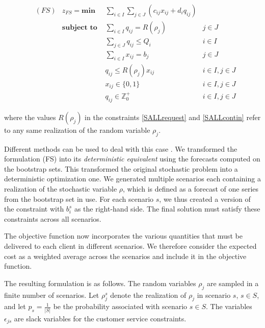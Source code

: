 \documentclass[ijoc,sglanonrev]{informs4}
\begin{document}
\begin{align}
&(FS) & z_{FS} = \textbf{min } & \sum_{i \in I} \sum_{j \in J} ( c_{ij}x_{ij} + d_i q_{ij} ) \label{SALLobj}\\
& &  \textbf{subject to }
     & \sum_{i \in I} q_{ij} = R(\rho_j) & j \in J  \label{SALLrequest}\\
& &  & \sum_{j \in J}q_{ij} \leq Q_i & i \in I \label{SALLcapacity}\\
& &  & \sum_{i \in I} x_{ij} = b_j & j \in J  \label{SALLnumserv}\\
& &  & q_{ij} \leq R(\rho_j) x_{ij} & i \in I, j \in J \label{SALLcontin}\\
& &  & x_{ij} \in \{0,1\} & i\in I, j \in J \label{SALLx}\\
& &  & q_{ij} \in \mathbb{Z}^+_0 & i\in I, j \in J \label{SALLq}
\end{align}

\noindent where the values $R(\rho_j)$ in the constraints \ref{SALLrequest} and \ref{SALLcontin} refer to any same realization of the random variable $\rho_j$.

Different methods can be used to deal with this case \citep{SDR09}. We transformed the formulation (FS) into its {\it deterministic equivalent} \citep{D55} using the forecasts computed on the bootstrap sets. This transformed the original stochastic problem into a deterministic optimization one. We generated multiple scenarios each containing a realization of the stochastic variable $\rho$, which is defined as a forecast of one series from the bootstrap set in use. For each scenario $s$, we thus created a version of the constraint with $b_i^{s}$ as the right-hand side. The final solution must satisfy these constraints across all scenarios.

The objective function now incorporates the various quantities that must be delivered to each client in different scenarios. We therefore consider the expected cost as a weighted average across the scenarios and include it in the objective function. 

The resulting formulation is as follows. The random variables $\rho_j$ are sampled in a finite number of scenarios. Let $\rho^s_j$ denote the realization of $\rho_j$ in scenario $s$, $s \in S$, and let $p_s = \frac{1}{|S|}$ be the probability associated with scenario $s \in S$. The variables $\epsilon_{js}$ are slack variables for the customer service constraints.
\end{document}
